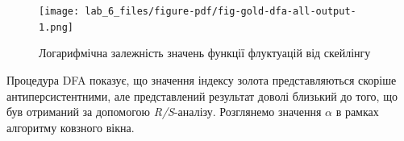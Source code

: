\documentclass[
  letterpaper,
]{report}
\newenvironment{Shaded}{\begin{snugshade}}{\end{snugshade}}
\newcommand{\DecValTok}[1]{\textcolor[rgb]{0.68,0.00,0.00}{#1}}
\newcommand{\NormalTok}[1]{\textcolor[rgb]{0.00,0.23,0.31}{#1}}
\newcommand{\OperatorTok}[1]{\textcolor[rgb]{0.37,0.37,0.37}{#1}}
\newcommand{\SpecialCharTok}[1]{\textcolor[rgb]{0.37,0.37,0.37}{#1}}
\newcommand{\StringTok}[1]{\textcolor[rgb]{0.13,0.47,0.30}{#1}}
\newcommand{\VerbatimStringTok}[1]{\textcolor[rgb]{0.13,0.47,0.30}{#1}}
\begin{document}
\begin{Shaded}
\end{Shaded}

\begin{figure}[H]

{\centering \texttt{[image: lab\_6\_files/figure-pdf/fig-gold-dfa-all-output-1.png]}

}

\caption{\label{fig-gold-dfa-all}Логарифмічна залежність значень функції
флуктуацій від скейлінгу}

\end{figure}

Процедура DFA показує, що значення індексу золота представляються
скоріше антиперсистентними, але представлений результат доволі близький
до того, що був отриманий за допомогою \emph{R/S}-аналізу. Розглянемо
значення \(\alpha\) в рамках алгоритму ковзного вікна.
\end{document}
